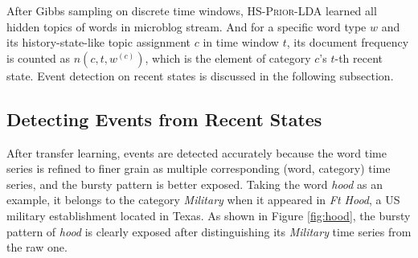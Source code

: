\documentclass{article}
\begin{document}

After Gibbs sampling on discrete time windows, \textsc{HS-Prior-LDA} learned all hidden topics of words in microblog stream.
And for a specific word type \(w\) and its history-state-like topic assignment \(c\) in time window \(t\), its document frequency is counted as \(n(c,t,w^{(c)})\), which is the element of category \(c\)'s \(t\)-th recent state.
Event detection on recent states is discussed in the following subsection.

\subsection{Detecting Events from Recent States}
\label{subsec:detection}
After transfer learning, events are detected accurately because the word time series is refined to finer grain as multiple corresponding (word, category) time series, and the bursty pattern is better exposed. 
Taking the word \textit{hood} as an example, it belongs to the category \textit{Military} when it appeared in \textit{Ft Hood}, a US military establishment located in Texas.
As shown in Figure \ref{fig:hood}, the bursty pattern of \textit{hood} is clearly exposed after distinguishing its \textit{Military} time series from the raw one.
\end{document}
